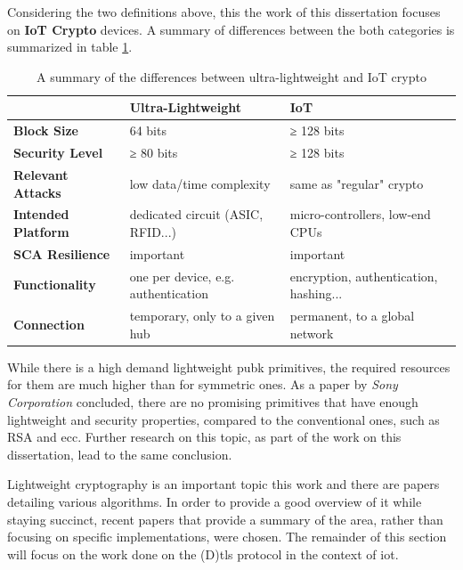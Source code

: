 \documentclass{llncs}
\begin{document}
Considering the two definitions above, this the work of this dissertation focuses on \textbf{IoT Crypto}
devices. A summary of differences between the both categories is summarized in
table \ref{ul-iot}.

\begin{table}[]
\centering
\caption{A summary of the differences between ultra-lightweight and IoT crypto}
\label{ul-iot}
\begin{tabular}{@{}lll@{}}
\toprule
                           & \textbf{Ultra-Lightweight}          & \textbf{IoT}                           \\ \midrule
\textbf{Block Size}        & 64 bits                             & ≥ 128 bits                             \\
\textbf{Security Level}    & ≥ 80 bits                           & ≥ 128 bits                             \\
\textbf{Relevant Attacks}  & low data/time complexity            & same as "regular" crypto               \\
\textbf{Intended Platform} & dedicated circuit (ASIC, RFID...)   & micro-controllers, low-end CPUs        \\
\textbf{SCA Resilience}    & important                           & important                              \\
\textbf{Functionality}     & one per device, e.g. authentication & encryption, authentication, hashing... \\
\textbf{Connection}        & temporary, only to a given hub      & permanent, to a global network         \\ \bottomrule
\end{tabular}
\end{table}

While there is a high demand lightweight \gls{pubk} primitives, the required
resources for them are much higher than for symmetric ones. As a
paper by \textit{Sony Corporation}\cite{b5b8db9716:online}
concluded, there are no promising primitives
that have enough lightweight and security properties, compared to the
conventional ones, such as RSA and \gls{ecc}. Further research on this topic, as part of the work on this dissertation, lead to the same conclusion.

Lightweight cryptography is an important topic this work and there are papers detailing
various algorithms. In order to provide a good overview of it while staying succinct, recent papers that provide a summary of the
area, rather than focusing on specific implementations, were chosen.
The remainder of this section will focus on the work done on the (D)\gls{tls} protocol in the context of \gls{iot}.
\end{document}
